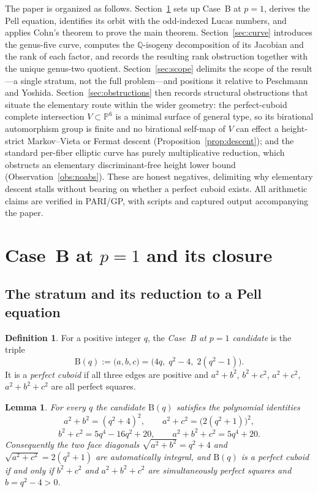 \documentclass[11pt,reqno]{amsart}
\theoremstyle{plain}
\newtheorem{lemma}[theorem]{Lemma}
\theoremstyle{definition}
\newtheorem{definition}[theorem]{Definition}
\newcommand{\Q}{\mathbb{Q}}
\newcommand{\PP}{\mathbb{P}}
\begin{document}
The paper is organized as follows. Section~\ref{sec:closure} sets up Case~B at
$p=1$, derives the Pell equation, identifies its orbit with the odd-indexed
Lucas numbers, and applies Cohn's theorem to prove the main theorem.
Section~\ref{sec:curve} introduces the genus-five curve, computes the
$\Q$-isogeny decomposition of its Jacobian and the rank of each factor, and
records the resulting rank obstruction together with the unique genus-two
quotient. Section~\ref{sec:scope} delimits the scope of the result---a single
stratum, not the full problem---and positions it relative to Peschmann and
Yoshida. Section~\ref{sec:obstructions} then records structural obstructions
that situate the elementary route within the wider geometry: the perfect-cuboid
complete intersection $V\subset\PP^6$ is a minimal surface of general type, so
its birational automorphism group is finite and no birational self-map of $V$
can effect a height-strict Markov--Vieta or Fermat descent
(Proposition~\ref{prop:descent}); and the standard per-fiber elliptic curve has
purely multiplicative reduction, which obstructs an elementary discriminant-free
height lower bound (Observation~\ref{obs:noabs}). These are honest negatives,
delimiting why elementary descent stalls without bearing on whether a perfect
cuboid exists. All arithmetic claims are verified in PARI/GP, with scripts and
captured output accompanying the paper.

\section{Case~B at \texorpdfstring{$p=1$}{p=1} and its closure}\label{sec:closure}

\subsection{The stratum and its reduction to a Pell equation}

\begin{definition}\label{def:caseB}
For a positive integer $q$, the \emph{Case~B at $p=1$ candidate} is the triple
\[
\mathrm{B}(q):=\bigl(a,b,c\bigr)=\bigl(4q,\;q^2-4,\;2(q^2-1)\bigr).
\]
It is a \emph{perfect cuboid} if all three edges are positive and
$a^2+b^2$, $b^2+c^2$, $a^2+c^2$, $a^2+b^2+c^2$ are all perfect squares.
\end{definition}

\begin{lemma}\label{lem:faces}
For every $q$ the candidate $\mathrm{B}(q)$ satisfies the polynomial identities
\[
a^2+b^2=(q^2+4)^2,\qquad a^2+c^2=\bigl(2(q^2+1)\bigr)^2,
\]
\[
b^2+c^2=5q^4-16q^2+20,\qquad a^2+b^2+c^2=5q^4+20 .
\]
Consequently the two face diagonals $\sqrt{a^2+b^2}=q^2+4$ and
$\sqrt{a^2+c^2}=2(q^2+1)$ are automatically integral, and $\mathrm{B}(q)$ is a
perfect cuboid if and only if $b^2+c^2$ and $a^2+b^2+c^2$ are simultaneously
perfect squares and $b=q^2-4>0$.
\end{lemma}
\end{document}
